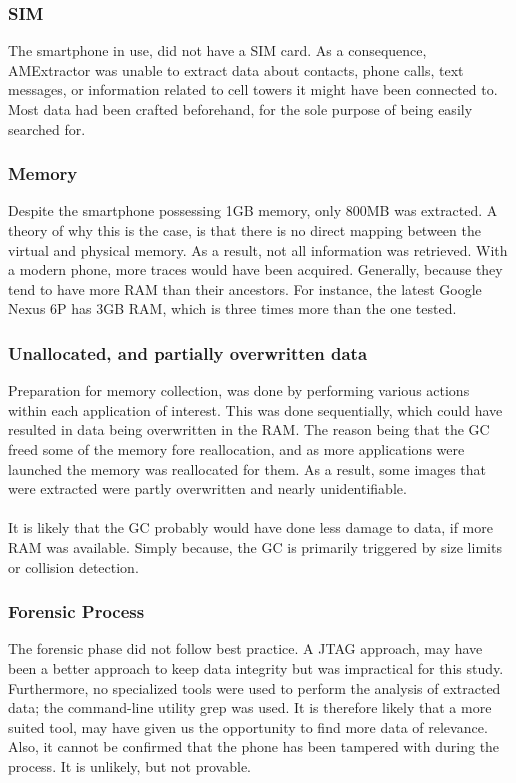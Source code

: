 \subsubsection{SIM}
The smartphone in use, did not have a SIM card. As a consequence, AMExtractor was unable to extract data about contacts, phone calls, text messages, or information related to cell towers it might have been connected to. Most data had been crafted beforehand, for the sole purpose of being easily searched for.
\subsubsection{Memory}
Despite the smartphone possessing 1GB memory, only 800MB was extracted. A theory of why this is the case, is that there is no direct mapping between the virtual and physical memory. As a result, not all information was retrieved. With a modern phone, more traces would have been acquired. Generally, because they tend to have more RAM than their ancestors. For instance, the latest Google Nexus 6P has 3GB RAM, which is three times more than the one tested\cite{huawei}.
\subsubsection{Unallocated, and partially overwritten data}
Preparation for memory collection, was done by performing various actions within each application of interest. This was done sequentially, which could have resulted in data being overwritten in the RAM. The reason being that the GC freed some of the memory fore reallocation, and as more applications were launched the memory was reallocated for them. As a result, some images that were extracted were partly overwritten and nearly unidentifiable.\\\\
It is likely that the GC probably would have done less damage to data, if more RAM was available. Simply because, the GC is primarily triggered by size limits or collision detection.
\subsubsection{Forensic Process}
The forensic phase did not follow best practice. A JTAG approach, may have been a better approach to keep data integrity but was impractical for this study. Furthermore, no specialized tools were used to perform the analysis of extracted data; the command-line utility grep was used. It is therefore likely that a more suited tool, may have given us the opportunity to find more data of relevance. Also, it cannot be confirmed that the phone has been tampered with during the process. It is unlikely, but not provable.\\
